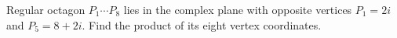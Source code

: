 Regular octagon $P_1\cdots P_8$ lies in the complex plane with opposite vertices $P_1=2i$ and $P_5=8+2i$. Find the product of its eight vertex coordinates.
